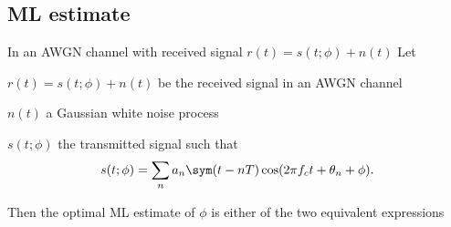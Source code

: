 \subsection{ML estimate}
\begin{theorem}
\label{thm:estML_QAM}
In an AWGN channel with received signal $r(t)=s(t;\phi)+n(t)$
Let
\begin{liste}
   \item $r(t)=s(t;\phi)+n(t)$ be the received signal in an AWGN channel
   \item $n(t)$ a Gaussian white noise process
   \item $s(t;\phi)$ the transmitted signal such that
       \[s(t;\phi) = \sum_n a_n \sym(t-nT)\cos(2\pi f_ct+\theta_n+\phi).\]
\end{liste}

Then the optimal ML estimate of $\phi$ is either of the two equivalent
expressions
\end{theorem}
